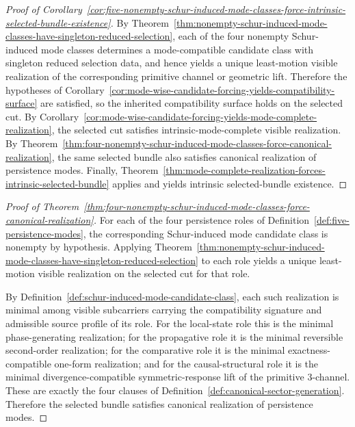 \begin{proof}[Proof of Corollary~\ref{cor:five-nonempty-schur-induced-mode-classes-force-intrinsic-selected-bundle-existence}]
\label{proof:cor:five-nonempty-schur-induced-mode-classes-force-intrinsic-selected-bundle-existence}
By
Theorem~\ref{thm:nonempty-schur-induced-mode-classes-have-singleton-reduced-selection},
each of the four nonempty Schur-induced mode classes determines a
mode-compatible candidate class with singleton reduced selection data, and
hence yields a unique least-motion visible realization of the corresponding
primitive channel or geometric lift. Therefore the hypotheses of
Corollary~\ref{cor:mode-wise-candidate-forcing-yields-compatibility-surface}
are satisfied, so the inherited compatibility surface holds on the selected
cut. By
Corollary~\ref{cor:mode-wise-candidate-forcing-yields-mode-complete-realization},
the selected cut satisfies intrinsic-mode-complete visible realization.
By
Theorem~\ref{thm:four-nonempty-schur-induced-mode-classes-force-canonical-realization},
the same selected bundle also satisfies canonical realization of persistence
modes. Finally,
Theorem~\ref{thm:mode-complete-realization-forces-intrinsic-selected-bundle}
applies and yields intrinsic selected-bundle existence.
\end{proof}

\begin{proof}[Proof of Theorem~\ref{thm:four-nonempty-schur-induced-mode-classes-force-canonical-realization}]
\label{proof:thm:four-nonempty-schur-induced-mode-classes-force-canonical-realization}
For each of the four persistence roles of
Definition~\ref{def:five-persistence-modes}, the corresponding Schur-induced
mode candidate class is nonempty by hypothesis. Applying
Theorem~\ref{thm:nonempty-schur-induced-mode-classes-have-singleton-reduced-selection}
to each role yields a unique least-motion visible realization on the selected
cut for that role.

By Definition~\ref{def:schur-induced-mode-candidate-class}, each such
realization is minimal among visible subcarriers carrying the compatibility
signature and admissible source profile of its role. For the local-state role
this is the minimal phase-generating realization; for the propagative role it
is the minimal reversible second-order realization; for the comparative role
it is the minimal exactness-compatible one-form realization; and for the
causal-structural role it is the minimal divergence-compatible
symmetric-response lift of the primitive \(3\)-channel. These are exactly the
four clauses of Definition~\ref{def:canonical-sector-generation}. Therefore
the selected bundle satisfies canonical realization of persistence modes.
\end{proof}


